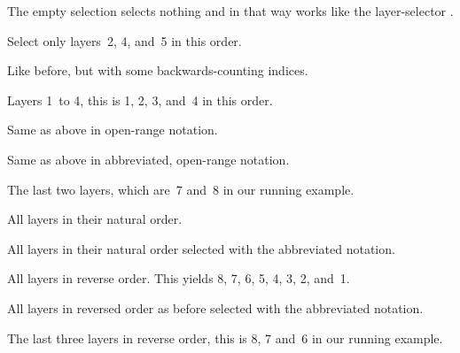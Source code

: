 \begin{codelist}
  \newcommand*{\lspec}[1]{\mbox{\val*{val:LAYERSPEC_OPEN}{#1}\val*{val:LAYERSPEC_CLOSE}}}%
\item[\lspec{}] The empty selection selects nothing and in that way works like the
  layer-selector .

\item[\lspec{2 :\ 4 :\ 5}] Select only layers~2, 4, and~5 in this order.

\item[\lspec{2 :\ -4 :\ -3}] Like before, but with some backwards-counting indices.

\item[\lspec{1 \val*{val:layer-range-separator}\ 4}] Layers 1~to 4, this is 1, 2, 3, and~4 in
  this order.

\item[\lspec{\val*{val:layer-range-empty-index-symbol}\ \val*{val:layer-range-separator}\ 4}]
  Same as above in open-range notation.

\item[\lspec{\val*{val:layer-range-separator}\ 4}] Same as above in abbreviated, open-range
  notation.

\item[\lspec{-2 \val*{val:layer-range-separator}\ \val*{val:layer-range-empty-index-symbol}}]
  The last two layers, which are~7 and~8 in our running example.

\item[\lspec{\val*{val:layer-range-empty-index-symbol}\ \val*{val:layer-range-separator}\ \val*{val:layer-range-empty-index-symbol}}]
  All layers in their natural order.

\item[\lspec{\val*{val:layer-range-separator}}] All layers in their natural order selected with
  the abbreviated notation.

\item[\lspec{reverse
    \val*{val:layer-range-empty-index-symbol}\ \val*{val:layer-range-separator}\ \val*{val:layer-range-empty-index-symbol}}]
  All layers in reverse order.  This yields 8, 7, 6, 5, 4, 3, 2, and~1.

\item[\lspec{rev \val*{val:layer-range-separator}}] All layers in reversed order as before
  selected with the abbreviated notation.

\item[\lspec{r -3 \val*{val:layer-range-separator}}] The last three layers in reverse order,
  this is 8, 7 and~6 in our running example.
\end{codelist}

